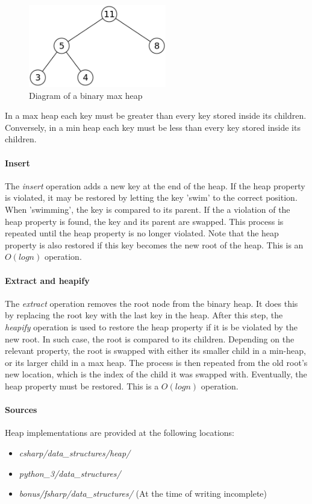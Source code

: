 \documentclass{article}
\begin{document}
\begin{figure}[H]
  \centering
  \includegraphics[width=6cm]{binary_heap}
  \caption{Diagram of a binary max heap}
\end{figure}

In a max heap each key must be greater than every key stored inside its children.
Conversely, in a min heap each key must be less than every key stored inside its children.

\paragraph{Insert}
The {\em insert} operation adds a new key at the end of the heap. If the heap property is violated,
it may be restored by letting the key 'swim' to the correct position. When 'swimming', the key
is compared to its parent. If the a violation of the heap property is found, the key and its parent
are swapped. This process is repeated until the heap property is no longer violated. Note that the
heap property is also restored if this key becomes the new root of the heap. This is an \(O(log n)\)
operation.

\paragraph{Extract and heapify}
The {\em extract} operation removes the root node from the binary heap. It does this by replacing
the root key with the last key in the heap. After this step, the {\em heapify} operation is used to
restore the heap property if it is be violated by the new root. In such case, the root is compared
to its children. Depending on the relevant property, the root is swapped with either its smaller child in a
min-heap, or its larger child in a max heap. The process is then repeated from the old root's new location,
which is the index of the child it was swapped with. Eventually, the heap property must be restored.
This is a \(O(log n)\) operation.

\paragraph{Sources}
Heap implementations are provided at the following locations:
\begin{itemize}
\item{{\em csharp/data\_structures/heap/}}
\item{{\em python\_3/data\_structures/}}
\item{{\em bonus/fsharp/data\_structures/} (At the time of writing incomplete)}
\end{itemize}
\end{document}
